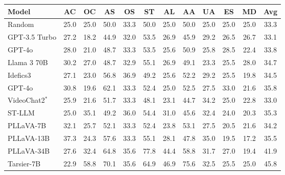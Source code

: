 \begin{table}[t]
\centering
\begin{adjustbox}{width=\columnwidth}
\begin{tabular}{lcccccccccc>{\columncolor{gray!10}}c}
\toprule
\textbf{Model} & \textbf{AC} & \textbf{OC} & \textbf{AS} & \textbf{OS} & \textbf{ST} & \textbf{AL} & \textbf{AA} & \textbf{UA} & \textbf{ES} & \textbf{MD} & \textbf{Avg} \\ 
\hline
Random & 25.0     & 25.0     & 50.0 & 33.3       & 50.0 & 25.0    & 50.0 & 25.0   & 25.0     & 25.0  & 33.3 \\
\midrule
GPT-3.5 Turbo & 27.2     & 18.2     & 44.9 & 32.0       & 53.5 & 26.9    & 45.9 & 29.2   & 26.5     & 26.7  & 33.1  \\
GPT-4o & 28.0     & 21.0     & 48.7 & 33.3       & 53.5 & 25.6    & 50.9 & 25.8   & 28.5     & 22.4   & 33.8 \\
Llama 3 70B & 30.2     & 27.0     & 48.7 & 32.9       & 55.1 & 26.9    & 49.1 & 23.3   & 25.5     & 28.0  & 34.7  \\
\midrule
Idefics3  & 27.1     & 23.0     & 56.8 & 36.9       & 49.2 & 25.6    & 52.2 & 29.2   & 25.5     & 19.8  & 34.5  \\
GPT-4o & 30.8     & 19.6     & 62.1 & 33.3       & 52.4 & 25.0    & 52.5 & 27.5   & 33.0     & 21.6   & 35.8 \\
\midrule
{VideoChat2}$^*$ & 25.9 & 21.6 & 51.7 & 33.3 & 48.1 & 23.1 & 44.7 & 34.2 & 25.0 & 22.8  & 33.0 \\
{ST-LLM } & 25.0     & 35.1     & 49.2 & 36.0       & 54.4 & 31.0    & 45.6 & 32.4   & 24.0     & 20.3   & 35.3 \\
{PLLaVA-7B} & 32.1     & 25.7     & 52.1 & 33.3       & 52.4 & 23.8    & 53.1 & 27.5   & 20.5     & 21.6  & 34.2  \\
{PLLaVA-13B} & 37.3     & 24.3     & 57.6 & 33.3       & 55.1 & 28.1 & 47.8 & 35.0   & 19.5     & 17.2  & 35.5  \\
{PLLaVA-34B} & 27.6     & 32.4     & 64.8 & 35.6       & 77.8 & 44.4    & 58.8 & 31.7   & 27.0     & 19.4   & 41.9 \\
{Tarsier-7B} & 22.9     & 58.8     & 70.1 & 35.6       & 64.9 & 46.9    & 75.6 & 32.5   & 25.5     & 25.0  & 45.8  \\

\end{tabular}
\end{adjustbox}
\end{table}
